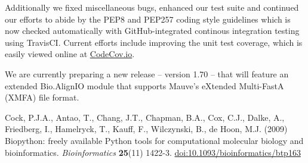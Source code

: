 \documentclass[10pt,oneside]{article}
\begin{document}
Additionally we fixed miscellaneous bugs, enhanced our test suite and continued our
efforts to abide by the PEP8 and PEP257 coding style guidelines which is now checked
automatically with GitHub-integrated continous integration testing using TravisCI.
Current efforts include improving the unit test coverage, which is easily viewed
online at \href{https://codecov.io/github/biopython/biopython/}{CodeCov.io}.

We are currently preparing a new release -- version 1.70 -- that will feature an
extended Bio.AlignIO module that supports Mauve's eXtended Multi-FastA (XMFA) file format.

\begin{thebibliography}{}

Cock, P.J.A., Antao, T., Chang, J.T., Chapman, B.A., Cox, C.J., Dalke, A., Friedberg, I., Hamelryck, T., Kauff, F., Wilczynski, B., de Hoon, M.J. (2009) Biopython: freely available Python tools for computational molecular biology and bioinformatics. {\it Bioinformatics} {\bf 25}(11) 1422-3. \href{http://dx.doi.org/10.1093/bioinformatics/btp163}{doi:10.1093/bioinformatics/btp163}

\end{thebibliography}
\end{document}
